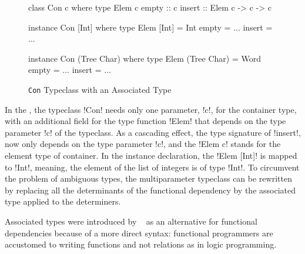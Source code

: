 \documentclass[screen,nonacm,manuscript,review]{acmart} %
\begin{document}
\begin{figure}[ht]
\begin{center}
\begin{minipage}[ht]{0.3\linewidth}
\begin{CenteredBox}
\begin{code}
class Con c where
  type Elem c
  empty :: c
  insert :: Elem c -> c -> c
\end{code}
\end{CenteredBox}
\end{minipage}%
\begin{minipage}[ht]{0.3\linewidth}
\begin{CenteredBox}
\begin{code}
instance Con [Int] where
  type Elem [Int] = Int
  empty = ...
  insert = ...
\end{code}
\end{CenteredBox}
\end{minipage}%
\begin{minipage}[ht]{0.3\linewidth}
\begin{CenteredBox}
\begin{code}
instance Con (Tree Char) where
  type Elem (Tree Char) = Word
  empty = ...
  insert = ...
\end{code}
\end{CenteredBox}
\end{minipage}
\end{center}
\caption[Con typeclass]{\lstinline{Con} Typeclass with an Associated Type}
\label{fig:assoc-types}
\end{figure}

In the , the typeclass !Con! needs only one
parameter, !c!, for the container type, with an additional field for
the type function !Elem! that depends on the type parameter !c! of the
typeclass. As a cascading effect, the type signature of !insert!,
now only depends on the type parameter !c!,
and the !Elem c! stands for the element
type of container. In the instance declaration, the !Elem [Int]! is mapped to
!Int!, meaning, the element of the list of integers is of type !Int!.
To circumvent the problem of ambiguous types,
the multiparameter typeclass can be
rewritten by replacing all the determinants of the functional
dependency by the associated type applied to the determiners.

Associated types were introduced by ~\citet{chakravarty_associated_2005}
as an alternative for functional dependencies because of a more
direct syntax: functional programmers are accustomed to writing
functions and not relations as in logic programming.
\end{document}
